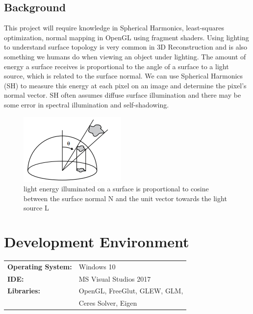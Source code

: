 \documentclass[10pt,twocolumn,letterpaper]{article}
\begin{document}
\subsection{Background}
This project will require knowledge in Spherical Harmonics, least-squares optimization, normal mapping in OpenGL using fragment shaders.
Using lighting to understand surface topology is very common in 3D Reconstruction and is also something we humans do when viewing an object under lighting. The amount of energy a surface receives is proportional to the angle of a surface to a light source, which is related to the surface normal. We can use Spherical Harmonics (SH) to measure this energy at each pixel on an image and determine the pixel's normal vector. SH often assumes diffuse surface illumination and there may be some error in spectral illumination and self-shadowing. 

\begin{figure}[h]
	\begin{center}
		\includegraphics [scale=0.8] {image/energy.png}
	\end{center}
	\caption{light energy illuminated on a surface is proportional to cosine between the surface normal N and the unit vector towards the light source L}
	\label{fig:vgg-16}
\end{figure} 

\section{Development Environment}
\begin{table}[h]
	\begin{tabular}{ll}
		\textbf{Operating System:} &  Windows 10  \\
		\textbf{IDE:} &  MS Visual Studios 2017  \\
		\textbf{Libraries:} &  OpenGL, FreeGlut, GLEW, GLM,\\
		&Ceres Solver, Eigen
	\end{tabular}
\end{table}
\end{document}
